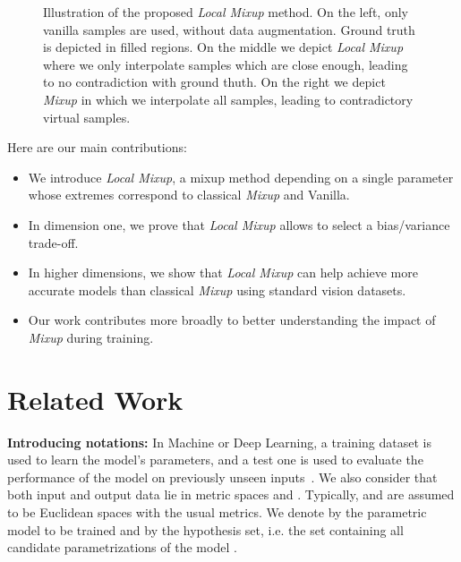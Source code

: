 \documentclass[twoside]{article}
\numberwithin{intassumption}{assumption}
\begin{document}
\begin{figure*}
\vspace{-2.2cm}
    \caption{Illustration of the proposed \emph{Local Mixup} method. On the left, only vanilla samples are used, without data augmentation. Ground truth is depicted in filled regions. On the middle we depict \emph{Local Mixup} where we only interpolate samples which are close enough, leading to no contradiction with ground thuth. On the right we depict \emph{Mixup} in which we interpolate all samples, leading to contradictory virtual samples.}
    \label{fig:method}
    \vspace{-0.1cm}
\end{figure*}

Here are our main contributions:
\begin{itemize}[noitemsep,topsep=0pt]
    \item We introduce \emph{Local Mixup}, a mixup method depending on a single parameter whose extremes correspond to classical \emph{Mixup} and Vanilla.
    \item In dimension one, we prove that \emph{Local Mixup} allows to select a bias/variance trade-off.
    \item In higher dimensions, we show that \emph{Local Mixup} can help achieve more accurate models than classical \emph{Mixup} using standard vision datasets.
    \item Our work contributes more broadly to better understanding the impact of \emph{Mixup} during training.
\end{itemize}

\section{Related Work}


\textbf{Introducing notations:}
In Machine or Deep Learning, a training dataset  is used to learn the model's parameters, and a test one  is used to evaluate the performance of the model on previously unseen inputs~\citep{bishop2006pattern}. We also consider that both input and output data lie in metric spaces  and . Typically,  and  are assumed to be Euclidean spaces with the usual metrics. We denote by  the parametric model to be trained and by  the hypothesis set, i.e. the set containing all candidate parametrizations of the model  .
\end{document}
